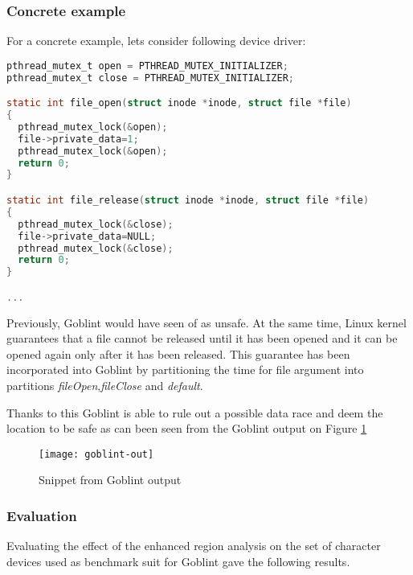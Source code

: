 \documentclass[..thesis.tex]{subfiles}
\begin{document}

\subsubsection{Concrete example}

For a concrete example, lets consider following device driver:

\begin{lstlisting}[language=c,style=def,columns=fullflexible]
pthread_mutex_t open = PTHREAD_MUTEX_INITIALIZER;
pthread_mutex_t close = PTHREAD_MUTEX_INITIALIZER;

static int file_open(struct inode *inode, struct file *file)
{
  pthread_mutex_lock(&open);
  file->private_data=1; 
  pthread_mutex_lock(&open);
  return 0;
}

static int file_release(struct inode *inode, struct file *file)
{
  pthread_mutex_lock(&close);
  file->private_data=NULL; 
  pthread_mutex_lock(&close);
  return 0;
}

...
\end{lstlisting}

Previously, Goblint would have seen  of  as unsafe. At the same time, Linux kernel guarantees that a file cannot be released until it has been opened and it can be opened again only after it has been released. This guarantee has been incorporated into Goblint by partitioning the time for file argument into partitions \textit{fileOpen},\textit{fileClose} and \textit{default}. 

Thanks to this Goblint is able to rule out a possible data race and deem the location to be safe as can been seen from the Goblint output on Figure \ref{Goblint-example}

\begin{figure}[H]
\texttt{[image: goblint-out]}
\caption{Snippet from Goblint output}
\label{Goblint-example}
\end{figure}
\subsubsection{Evaluation}


Evaluating the effect of the enhanced region analysis on the set of character devices used as benchmark suit for Goblint gave the following results.
\end{document}
